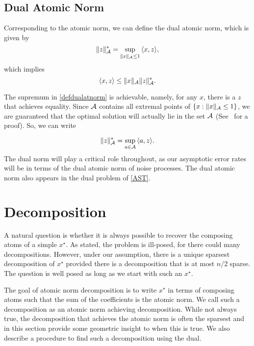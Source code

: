 \subsection{Dual Atomic Norm}

Corresponding to the atomic norm, we can define the dual atomic norm, which is given by
\begin{equation}
  \label{defdualatnorm}
  \lVert z\rVert_{\mathcal{A}}^* = \sup_{\lVert x\rVert_{\mathcal{A}} \leq 1}{\langle x, z\rangle},
\end{equation}
which implies
\begin{equation}
  \label{holder}
  \langle x, z\rangle \leq \lVert x\rVert_{\mathcal{A}} \lVert z\rVert_{\mathcal{A}}^*.
\end{equation}

The supremum in \eqref{defdualatnorm} is achievable, namely, for any $x$, there
is a $z$ that achieves equality. Since $\mathcal{A}$ contains all extremal points of
$\{x: \|x\|_{\mathcal{A}} \leq 1\}$, we are guaranteed that the optimal solution will
actually lie in the set $\mathcal{A}$ (See~\cite{bonsall} for a proof). So, we can write

\begin{equation}
\lVert z\rVert_{\mathcal{A}}^* = \sup_{a \in \mathcal{A}}{\langle a, z\rangle}.\label{bonsall}
\end{equation}
The dual norm will play a critical role throughout, as our asymptotic error
rates will be in terms of the dual atomic norm of noise processes. The dual
atomic norm also appears in the dual problem of \eqref{AST}.

\section{Decomposition}
\label{sec:decomposition}

A natural question is whether it is always possible to recover the composing
atoms of a simple $x^\star$. As stated, the problem is ill-posed, for there
could many decompositions. However, under our assumption, there is a unique
sparsest decomposition of $x^\star$ provided there is a decomposition that is at
most $n/2$ sparse. The question is well posed as long as we start with such an $x^\star.$

The goal of atomic norm decomposition is to write $x^\star$ in terms of
composing atoms such that the sum of the coefficients is the atomic norm. We
call such a decomposition as an atomic norm achieving decomposition. While not
always true, the decomposition that achieves the atomic norm is often the
sparsest and in this section provide some geometric insight to when this is
true. We also describe a procedure to find such a decomposition using the dual.

